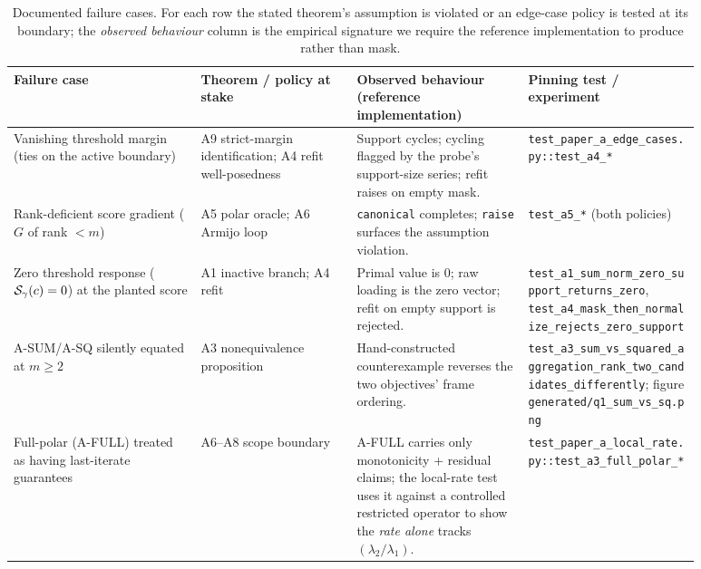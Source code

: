 \begin{table}[t]
\centering
\caption{Documented failure cases. For each row the stated theorem's assumption is violated or an edge-case policy is tested at its boundary; the \emph{observed behaviour} column is the empirical signature we require the reference implementation to produce rather than mask.}
\label{tab:a-failure-cases}
\small
\begin{tabular}{p{0.24\linewidth}p{0.20\linewidth}p{0.22\linewidth}p{0.22\linewidth}}
\toprule
Failure case & Theorem / policy at stake & Observed behaviour (reference implementation) & Pinning test / experiment \\
\midrule
Vanishing threshold margin (ties on the active boundary) & A9 strict-margin identification; A4 refit well-posedness & Support cycles; cycling flagged by the probe's support-size series; refit raises on empty mask. & \texttt{test\_paper\_a\_edge\_cases.py::test\_a4\_*} \\
\addlinespace
Rank-deficient score gradient ($G$ of rank $<m$) & A5 polar oracle; A6 Armijo loop & \texttt{canonical} completes; \texttt{raise} surfaces the assumption violation. & \texttt{test\_a5\_*} (both policies) \\
\addlinespace
Zero threshold response ($\mathcal{S}_\gamma(c)=0$) at the planted score & A1 inactive branch; A4 refit & Primal value is $0$; raw loading is the zero vector; refit on empty support is rejected. & \texttt{test\_a1\_sum\_norm\_zero\_support\_returns\_zero}, \texttt{test\_a4\_mask\_then\_normalize\_rejects\_zero\_support} \\
\addlinespace
A-SUM/A-SQ silently equated at $m\!\ge\!2$ & A3 nonequivalence proposition & Hand-constructed counterexample reverses the two objectives' frame ordering. & \texttt{test\_a3\_sum\_vs\_squared\_aggregation\_rank\_two\_candidates\_differently}; figure \texttt{generated/q1\_sum\_vs\_sq.png} \\
\addlinespace
Full-polar (A-FULL) treated as having last-iterate guarantees & A6--A8 scope boundary & A-FULL carries only monotonicity + residual claims; the local-rate test uses it against a controlled restricted operator to show the \emph{rate alone} tracks $(\lambda_2/\lambda_1)$. & \texttt{test\_paper\_a\_local\_rate.py::test\_a3\_full\_polar\_*} \\

\end{tabular}
\end{table}

